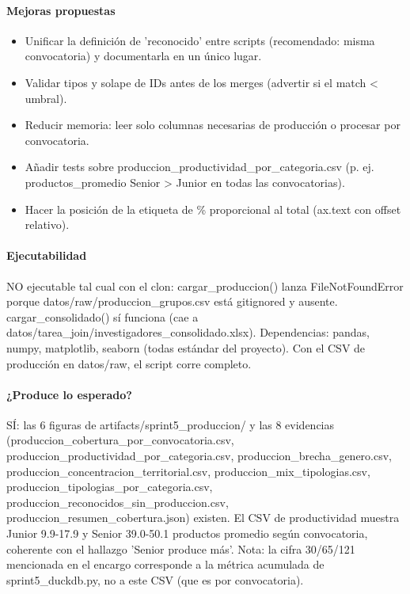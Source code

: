 \paragraph{Mejoras propuestas}
\begin{itemize}
  \item Unificar la definición de 'reconocido' entre scripts (recomendado: misma convocatoria) y documentarla en un único lugar.
  \item Validar tipos y solape de IDs antes de los merges (advertir si el match < umbral).
  \item Reducir memoria: leer solo columnas necesarias de producción o procesar por convocatoria.
  \item Añadir tests sobre produccion\_productividad\_por\_categoria.csv (p. ej. productos\_promedio Senior > Junior en todas las convocatorias).
  \item Hacer la posición de la etiqueta de \% proporcional al total (ax.text con offset relativo).
\end{itemize}

\paragraph{Ejecutabilidad}
NO ejecutable tal cual con el clon: cargar\_produccion() lanza FileNotFoundError porque datos/raw/produccion\_grupos.csv está gitignored y ausente. cargar\_consolidado() sí funciona (cae a datos/tarea\_join/investigadores\_consolidado.xlsx). Dependencias: pandas, numpy, matplotlib, seaborn (todas estándar del proyecto). Con el CSV de producción en datos/raw, el script corre completo.

\paragraph{¿Produce lo esperado?}
SÍ: las 6 figuras de artifacts/sprint5\_produccion/ y las 8 evidencias (produccion\_cobertura\_por\_convocatoria.csv, produccion\_productividad\_por\_categoria.csv, produccion\_brecha\_genero.csv, produccion\_concentracion\_territorial.csv, produccion\_mix\_tipologias.csv, produccion\_tipologias\_por\_categoria.csv, produccion\_reconocidos\_sin\_produccion.csv, produccion\_resumen\_cobertura.json) existen. El CSV de productividad muestra Junior 9.9-17.9 y Senior 39.0-50.1 productos promedio según convocatoria, coherente con el hallazgo 'Senior produce más'. Nota: la cifra 30/65/121 mencionada en el encargo corresponde a la métrica acumulada de sprint5\_duckdb.py, no a este CSV (que es por convocatoria).

